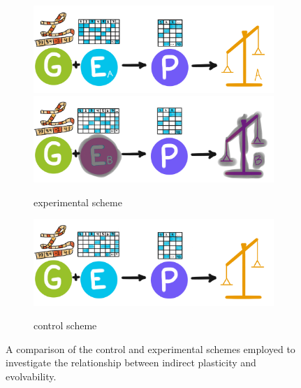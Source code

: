\begin{figure}
  \centering
  \begin{subfigure}[b]{0.5\textwidth}
    \centering
    \includegraphics[width=\textwidth]{img/indirectschemeA} \\
    \includegraphics[width=\textwidth]{img/indirectschemeB}
    \caption{experimental scheme}
    \label{subfig:directscheme}
  \end{subfigure}%
  \hfill
  \begin{subfigure}[b]{0.5\textwidth}
    \centering
    
 \includegraphics[width=\textwidth]{img/modelscheme} \\
 \vspace{5ex}
    
    \caption{control scheme}
     \label{subfig:controlscheme}
  \end{subfigure}
  \captionsetup{singlelinecheck=off,justification=raggedright}
  \caption{A comparison of the control and experimental schemes employed to investigate the relationship between indirect plasticity and evolvability.}
  \label{fig:direct_plasticity_scheme}
\end{figure}